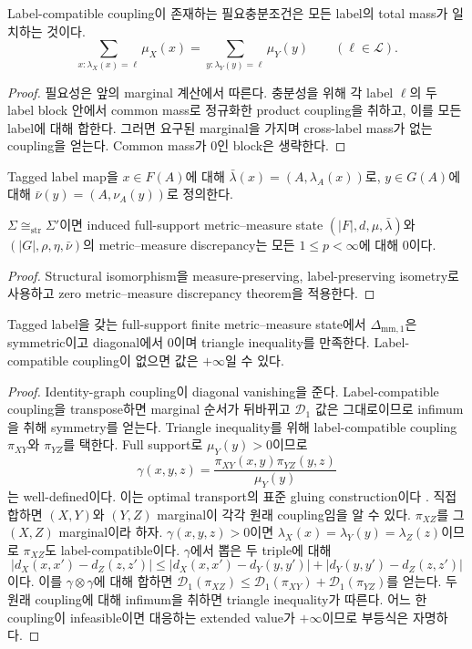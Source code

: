 \begin{proposition}
Label-compatible coupling이 존재하는 필요충분조건은 모든 label의 total mass가
일치하는 것이다.
\[
\sum_{x:\lambda_X(x)=\ell}\mu_X(x)
=
\sum_{y:\lambda_Y(y)=\ell}\mu_Y(y)
\qquad(\ell\in\mathcal L).
\]
\end{proposition}

\begin{proof}
필요성은 앞의 marginal 계산에서 따른다. 충분성을 위해 각 label $\ell$의
두 label block 안에서 common mass로 정규화한 product coupling을 취하고,
이를 모든 label에 대해 합한다. 그러면 요구된 marginal을 가지며 cross-label
mass가 없는 coupling을 얻는다. Common mass가 0인 block은 생략한다.
\end{proof}

Tagged label map을 $x\in F(A)$에 대해 $\bar\lambda(x)=(A,\lambda_A(x))$로,
$y\in G(A)$에 대해 $\bar\nu(y)=(A,\nu_A(y))$로 정의한다.

\begin{corollary}
$\Sigma\cong_{\mathrm{str}}\Sigma'$이면 induced full-support metric--measure
state $(|F|,d,\mu,\bar\lambda)$와 $(|G|,\rho,\eta,\bar\nu)$의 metric--measure
discrepancy는 모든 $1\leq p<\infty$에 대해 0이다.
\end{corollary}

\begin{proof}
Structural isomorphism을 measure-preserving, label-preserving isometry로
사용하고 zero metric--measure discrepancy theorem을 적용한다.
\end{proof}
\begin{proposition}
Tagged label을 갖는 full-support finite metric--measure state에서
$\Delta_{\mathrm{mm},1}$은 symmetric이고 diagonal에서 0이며 triangle
inequality를 만족한다. Label-compatible coupling이 없으면 값은 $+\infty$일
수 있다.
\end{proposition}

\begin{proof}
Identity-graph coupling이 diagonal vanishing을 준다. Label-compatible
coupling을 transpose하면 marginal 순서가 뒤바뀌고 $\mathcal D_1$ 값은
그대로이므로 infimum을 취해 symmetry를 얻는다. Triangle inequality를 위해
label-compatible coupling $\pi_{XY}$와 $\pi_{YZ}$를 택한다. Full support로
$\mu_Y(y)>0$이므로
\[
\gamma(x,y,z)=\frac{\pi_{XY}(x,y)\pi_{YZ}(y,z)}{\mu_Y(y)}
\]
는 well-defined이다. 이는 optimal transport의 표준 gluing construction이다
\cite{villani2009optimal,peyre2019computational}. 직접 합하면 $(X,Y)$와 $(Y,Z)$ marginal이 각각
원래 coupling임을 알 수 있다. $\pi_{XZ}$를 그 $(X,Z)$ marginal이라 하자.
$\gamma(x,y,z)>0$이면
$\lambda_X(x)=\lambda_Y(y)=\lambda_Z(z)$이므로 $\pi_{XZ}$도
label-compatible이다. $\gamma$에서 뽑은 두 triple에 대해
\[
|d_X(x,x')-d_Z(z,z')|
\leq |d_X(x,x')-d_Y(y,y')|+|d_Y(y,y')-d_Z(z,z')|
\]
이다. 이를 $\gamma\otimes\gamma$에 대해 합하면
$\mathcal D_1(\pi_{XZ})\leq\mathcal D_1(\pi_{XY})+
\mathcal D_1(\pi_{YZ})$를 얻는다. 두 원래 coupling에 대해 infimum을 취하면 triangle inequality가
따른다. 어느 한 coupling이 infeasible이면 대응하는 extended value가
$+\infty$이므로 부등식은 자명하다.
\end{proof}
